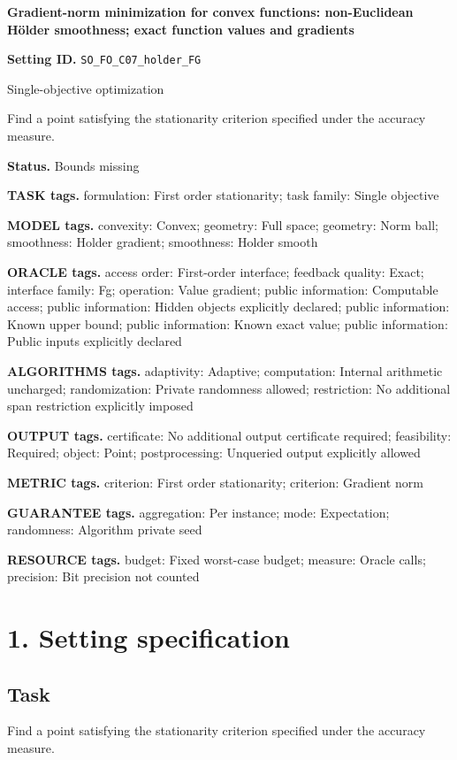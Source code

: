 \documentclass[10pt,a4paper]{article}
\begin{document}
\raggedright

{\LARGE\bfseries\sffamily\color{AtlasNavy} Gradient-norm minimization for convex functions: non-Euclidean Hölder smoothness; exact function values and gradients\par}\vspace{5pt}
\textbf{Setting ID.} \texttt{SO\_\allowbreak{}FO\_\allowbreak{}C07\_\allowbreak{}holder\_\allowbreak{}FG}

Single-objective optimization

Find a point satisfying the stationarity criterion specified under the accuracy measure.

\textbf{Status.} Bounds missing

\textbf{TASK tags.} formulation: First order stationarity; task family: Single objective

\textbf{MODEL tags.} convexity: Convex; geometry: Full space; geometry: Norm ball; smoothness: Holder gradient; smoothness: Holder smooth

\textbf{ORACLE tags.} access order: First-order interface; feedback quality: Exact; interface family: Fg; operation: Value gradient; public information: Computable access; public information: Hidden objects explicitly declared; public information: Known upper bound; public information: Known exact value; public information: Public inputs explicitly declared

\textbf{ALGORITHMS tags.} adaptivity: Adaptive; computation: Internal arithmetic uncharged; randomization: Private randomness allowed; restriction: No additional span restriction explicitly imposed

\textbf{OUTPUT tags.} certificate: No additional output certificate required; feasibility: Required; object: Point; postprocessing: Unqueried output explicitly allowed

\textbf{METRIC tags.} criterion: First order stationarity; criterion: Gradient norm

\textbf{GUARANTEE tags.} aggregation: Per instance; mode: Expectation; randomness: Algorithm private seed

\textbf{RESOURCE tags.} budget: Fixed worst-case budget; measure: Oracle calls; precision: Bit precision not counted

\section{1. Setting specification}
\subsection{Task}
Find a point satisfying the stationarity criterion specified under the accuracy measure.
\end{document}
